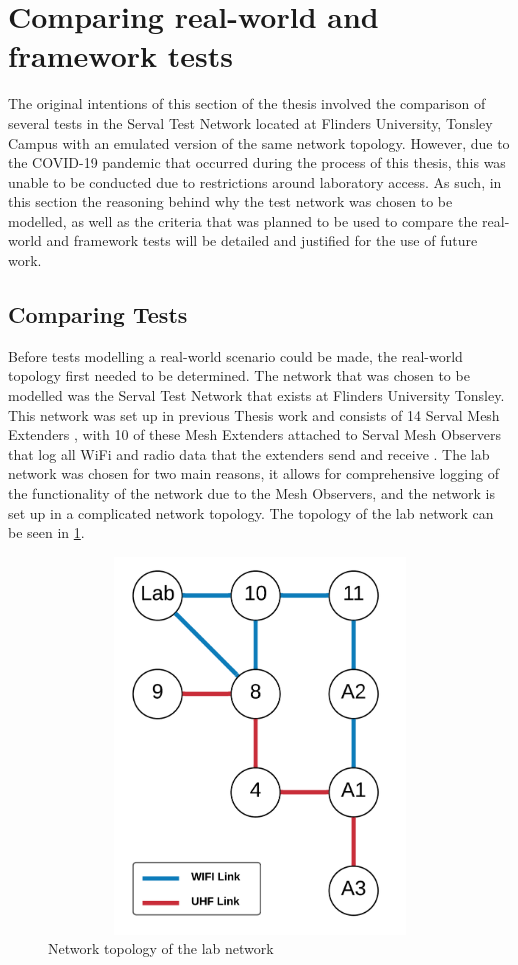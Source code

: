 \section{Comparing real-world and framework tests}
The original intentions of this section of the thesis involved the comparison of several tests in the Serval Test Network located at Flinders University, Tonsley Campus with an emulated version of the same network topology.
However, due to the COVID-19 pandemic that occurred during the process of this thesis, this was unable to be conducted due to restrictions around laboratory access.
As such, in this section the reasoning behind why the test network was chosen to be modelled, as well as the criteria that was planned to be used to compare the real-world and framework tests will be detailed and justified for the use of future work.


\subsection{Comparing Tests}
Before tests modelling a real-world scenario could be made, the real-world topology first needed to be determined.
The network that was chosen to be modelled was the Serval Test Network that exists at Flinders University Tonsley.
This network was set up in previous Thesis work and consists of 14 Serval Mesh Extenders \parencite{wade_2019}, with 10 of these Mesh Extenders attached to Serval Mesh Observers that log all WiFi and radio data that the extenders send and receive \parencite{lancaster_2019}.
The lab network was chosen for two main reasons, it allows for comprehensive logging of the functionality of the network due to the Mesh Observers, and the network is set up in a complicated network topology.
The topology of the lab network can be seen in \figurename{ \ref{fig:chapter6LabNetwork}}.

\begin{figure}
    \begin{centering}
        \includegraphics[width=15cm,height=10cm,keepaspectratio]{Figures/Chapter6-LabTopology.png}
        \caption{Network topology of the lab network}
        \label{fig:chapter6LabNetwork}
    \end{centering}
\end{figure}


